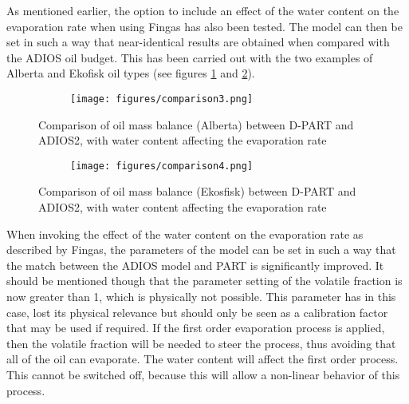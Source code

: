 \documentclass[english]{deltares_manual}
\begin{document}
As mentioned earlier, the option to include an effect of the water content on the evaporation rate when using Fingas has also been tested. The model can then be set in such a way that near-identical results are obtained when compared with the ADIOS oil budget. This has been carried out with the two examples of Alberta and Ekofisk oil types (see figures \ref{fig:comparebalance3} and \ref{fig:comparebalance4}).%
\begin{figure}[H]%
	\begin{subfigure}{1.0\textwidth}
		\texttt{[image: figures/comparison3.png]}%
	\end{subfigure}
	\caption{Comparison of oil mass balance (Alberta) between D-PART and ADIOS2, with water content affecting the evaporation rate}
	\label{fig:comparebalance3}
\end{figure}
\begin{figure}[H]
	\begin{subfigure}{1.0\textwidth}
		\texttt{[image: figures/comparison4.png]}
	\end{subfigure}
	\caption{Comparison of oil mass balance (Ekosfisk) between D-PART and ADIOS2, with water content affecting the evaporation rate}
	\label{fig:comparebalance4}
\end{figure}

When invoking the effect of the water content on the evaporation rate as described by Fingas, the parameters of the model can be set in such a way that the match between the ADIOS model and PART is significantly improved. It should be mentioned though that the parameter setting of the volatile fraction is now greater than 1, which is physically not possible. This parameter has in this case, lost its physical relevance but should only be seen as a calibration factor that may be used if required. If the first order evaporation process is applied, then the volatile fraction will be needed to steer the process, thus avoiding that all of the oil can evaporate. The water content will affect the first order process.  This cannot be switched off, because this will allow a non-linear behavior of this process. 
\end{document}
